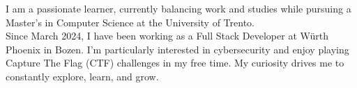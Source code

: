
\begin{cvparagraph}

	I am a passionate learner, currently balancing work and studies while pursuing a Master’s in Computer Science at the University of Trento.\\
	Since March 2024, I have been working as a Full Stack Developer at Würth Phoenix in Bozen.
	I’m particularly interested in cybersecurity and enjoy playing Capture The Flag (CTF) challenges in my free time.
	My curiosity drives me to constantly explore, learn, and grow.

\end{cvparagraph}
